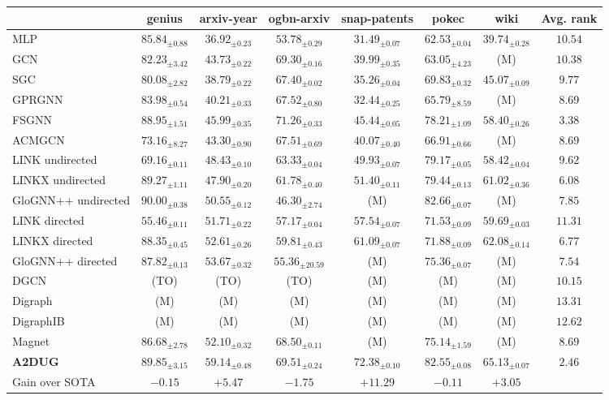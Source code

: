 \begin{table*}[t]
{\begin{tabular}{l|ccc|ccc|c}
{}&genius&arxiv-year&ogbn-arxiv&snap-patents&pokec&wiki&Avg. rank\\
\midrule
MLP & $85.84_{\pm0.88}$ &$36.92_{\pm0.23}$ & $53.78_{\pm0.29}$ &$31.49_{\pm0.07}$ &$62.53_{\pm0.04}$ &$39.74_{\pm0.28}$ & $10.54$\\ \midrule
GCN & $82.23_{\pm3.42}$ &$43.73_{\pm0.22}$ & $69.30_{\pm0.16}$ &$39.99_{\pm0.35}$ & $63.05_{\pm4.23}$ & (M) & $10.38$\\
SGC & $80.08_{\pm2.82}$ &$38.79_{\pm0.22}$ & $67.40_{\pm0.02}$ &$35.26_{\pm0.04}$ &$69.83_{\pm0.32}$ &$45.07_{\pm0.09}$ & $9.77$\\
GPRGNN& $83.98_{\pm0.54}$ &$40.21_{\pm0.33}$ & $67.52_{\pm0.80}$ &$32.44_{\pm0.25}$ &$65.79_{\pm8.59}$ & (M) & $8.69$\\
FSGNN & $88.95_{\pm1.51}$ &$45.99_{\pm0.35}$ & \colorbox{mycolor}{$71.26_{\pm0.33}$} &$45.44_{\pm0.05}$ &$78.21_{\pm1.09}$ &$58.40_{\pm0.26}$ & $3.38$ \\
ACMGCN& $73.16_{\pm8.27}$ &$43.30_{\pm0.90}$ & $67.51_{\pm0.69}$ &$40.07_{\pm0.40}$ &$66.91_{\pm0.66}$ & (M) & $8.69$ \\\midrule
LINK undirected & $69.16_{\pm0.11}$ &$48.43_{\pm0.10}$ & $63.33_{\pm0.04}$ &$49.93_{\pm0.07}$ &$79.17_{\pm0.05}$ &$58.42_{\pm0.04}$ & $9.62$\\
LINKX undirected& $89.27_{\pm1.11}$ &$47.90_{\pm0.20}$ & $61.78_{\pm0.40}$ &$51.40_{\pm0.11}$ &$79.44_{\pm0.13}$ &$61.02_{\pm0.36}$ & $6.08$ \\
GloGNN++ undirected & \colorbox{mycolor}{$90.00_{\pm0.38}$} &$50.55_{\pm0.12}$ & $46.30_{\pm2.74}$ & (M) &\colorbox{mycolor}{$82.66_{\pm0.07}$} & (M) & $7.85$ \\ \midrule
LINK directed & $55.46_{\pm0.11}$ &$51.71_{\pm0.22}$ & $57.17_{\pm0.04}$ &$57.54_{\pm0.07}$ &$71.53_{\pm0.09}$ &$59.69_{\pm0.03}$ & $11.31$ \\
LINKX directed& $88.35_{\pm0.45}$ &$52.61_{\pm0.26}$ & $59.81_{\pm0.43}$ &\colorbox{mycolor}{$61.09_{\pm0.07}$} &$71.88_{\pm0.09}$ &\colorbox{mycolor}{$62.08_{\pm0.14}$} & $6.77$ \\
GloGNN++ directed & $87.82_{\pm0.13}$ &\colorbox{mycolor}{$53.67_{\pm0.32}$} &$55.36_{\pm20.59}$ & (M) &$75.36_{\pm0.07}$ & (M) & $7.54$ \\ \midrule
DGCN& (TO) & (TO) &(TO) &(M) & (M) &(M) & $10.15$\\
Digraph & (M) & (M) &(M) & (M) & (M) &(M) & $13.31$\\
DigraphIB & (M) & (M) &(M) & (M) & (M) &(M) & $12.62$\\
Magnet& $86.68_{\pm2.78}$ &$52.10_{\pm0.32}$ & $68.50_{\pm0.11}$ & (M) &$75.14_{\pm1.59}$ & (M) & $8.69$ \\ \midrule
\textbf{\textsc{A2DUG}}&\colorbox{mycolor}{$89.85_{\pm3.15}$}&\colorbox{mycolor}{$59.14_{\pm0.48}$}&\colorbox{mycolor}{$69.51_{\pm0.24}$}&\colorbox{mycolor}{$72.38_{\pm0.10}$}&\colorbox{mycolor}{$82.55_{\pm0.08}$}&\colorbox{mycolor}{$65.13_{\pm0.07}$} & $2.46$\\
Gain over SOTA & $-0.15$ & $+5.47$ & $-1.75$ & $+11.29$ & $-0.11$ & $+3.05$ &  \\ \bottomrule
\end{tabular}
}
\label{tb:accuracy}
\end{table*} 
